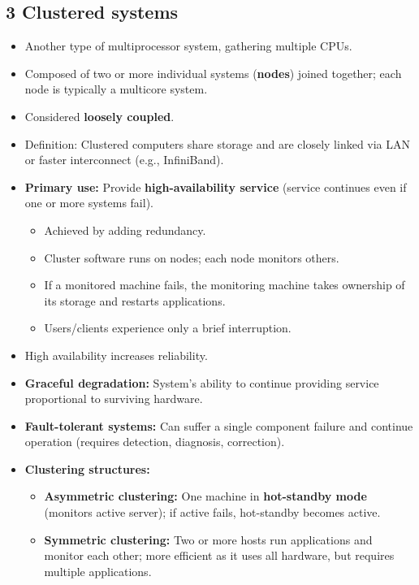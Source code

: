 \documentclass{article}
\begin{document}
\subsection*{3 Clustered systems}
\begin{itemize}
    \item Another type of multiprocessor system, gathering multiple CPUs.
    \item Composed of two or more individual systems (\textbf{nodes}) joined together; each node is typically a multicore system.
    \item Considered \textbf{loosely coupled}.
    \item Definition: Clustered computers share storage and are closely linked via LAN or faster interconnect (e.g., InfiniBand).
    \item \textbf{Primary use:} Provide \textbf{high-availability service} (service continues even if one or more systems fail).
    \begin{itemize}
        \item Achieved by adding redundancy.
        \item Cluster software runs on nodes; each node monitors others.
        \item If a monitored machine fails, the monitoring machine takes ownership of its storage and restarts applications.
        \item Users/clients experience only a brief interruption.
    \end{itemize}
    \item High availability increases reliability.
    \item \textbf{Graceful degradation:} System's ability to continue providing service proportional to surviving hardware.
    \item \textbf{Fault-tolerant systems:} Can suffer a single component failure and continue operation (requires detection, diagnosis, correction).
    \item \textbf{Clustering structures:}
    \begin{itemize}
        \item \textbf{Asymmetric clustering:} One machine in \textbf{hot-standby mode} (monitors active server); if active fails, hot-standby becomes active.
        \item \textbf{Symmetric clustering:} Two or more hosts run applications and monitor each other; more efficient as it uses all hardware, but requires multiple applications.

\end{itemize}
\end{itemize}
\end{document}
